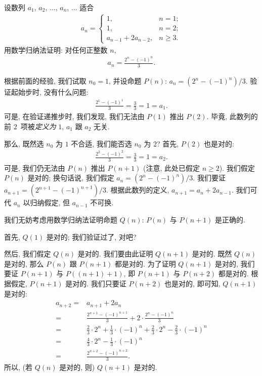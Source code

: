 \begin{example}
    设数列 \(a_1\), \(a_2\), \(\dots\), \(a_n\), \(\dots\) 适合
    \begin{align*}
        a_n =
        \begin{cases}
            1,                  & n = 1;    \\
            1,                  & n = 2;    \\
            a_{n-1} + 2a_{n-2}, & n \geq 3.
        \end{cases}
    \end{align*}
    用数学归纳法证明:
    对任何正整数 \(n\),
    \begin{align*}
        a_n = \frac{2^n - (-1)^n}{3}.
    \end{align*}

    根据前面的经验,
    我们试取 \(n_0 = 1\),
    并设命题 \(P(n)\): \(a_n = (2^n - (-1)^n)/3\).
    验证起始步时, 没有什么问题:
    \begin{align*}
        \frac{2^1 - (-1)^1}{3} = \frac{3}{3} = 1 = a_1.
    \end{align*}
    可是, 在验证递推步时,
    我们发现,
    我们无法由 \(P(1)\) 推出 \(P(2)\).
    毕竟, 此数列的前 \(2\)~项被\emph{定义为} \(1\),
    \(a_1\) 跟 \(a_2\) 无关.

    那么, 既然选 \(n_0\) 为 \(1\) 不合适,
    我们能否选 \(n_0\) 为 \(2\)?
    首先, \(P(2)\) 也是对的:
    \begin{align*}
        \frac{2^2 - (-1)^2}{3} = \frac{3}{3} = 1 = a_2.
    \end{align*}
    可是,
    我们仍无法由 \(P(n)\) 推出 \(P(n+1)\)
    (注意, 此处已假定 \(n \geq 2\)).
    我们假定 \(P(n)\) 是对的;
    换句话说, 我们假定 \(a_n = (2^n - (-1)^n)/3\).
    我们要证 \(a_{n+1} = (2^{n+1} - (-1)^{n+1})/3\).
    根据此数列的定义,
    \(a_{n+1} = a_n + 2a_{n-1}\).
    我们可代 \(a_n\) 以归纳假定,
    但 \(a_{n-1}\) 不可换.

    我们无妨考虑用数学归纳法证明命题
    \(Q(n)\):
    \(P(n)\) 与 \(P(n+1)\) 是正确的.

    首先, \(Q(1)\) 是对的; 我们验证过了, 对吧?

    然后, 我们假定 \(Q(n)\) 是对的.
    我们要由此证明 \(Q(n+1)\) 是对的.
    既然 \(Q(n)\) 是对的, 那么 \(P(n)\) 跟 \(P(n+1)\) 都是对的.
    为了证明 \(Q(n+1)\) 是对的, 我们要证
    \(P(n+1)\) 与 \(P((n+1)+1)\),
    即 \(P(n+1)\) 与 \(P(n+2)\) 都是对的.
    根据假定, \(P(n+1)\) 是对的.
    我们只要证 \(P(n+2)\) 也是对的,
    即可知, \(Q(n+1)\) 是对的:
    \begin{align*}
        a_{n+2}
        = {} & a_{n+1} + 2a_n
        \\
        = {} & \frac{2^{n+1} - (-1)^{n+1}}{3}
        + 2 \cdot \frac{2^n - (-1)^n}{3}
        \\
        = {} & \frac{2}{3} \cdot 2^n + \frac{1}{3} \cdot (-1)^n
        + \frac{2}{3} \cdot 2^n - \frac{2}{3} \cdot (-1)^n
        \\
        = {} & \frac{4}{3} \cdot 2^n - \frac{1}{3} \cdot (-1)^n
        \\
        = {} & \frac{2^{n+2} - (-1)^{n+2}}{3}.
    \end{align*}
    所以, (若 \(Q(n)\) 是对的, 则) \(Q(n+1)\) 是对的.


\end{example}
